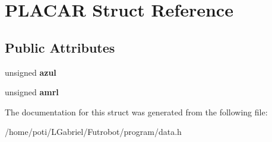 \hypertarget{structPLACAR}{}\section{P\+L\+A\+C\+AR Struct Reference}
\label{structPLACAR}
\subsection*{Public Attributes}
\begin{DoxyCompactItemize}
\item 
unsigned {\bfseries azul}\hypertarget{structPLACAR_aae2b510dd4eac68c9b2e69841c1fd625}{}\label{structPLACAR_aae2b510dd4eac68c9b2e69841c1fd625}

\item 
unsigned {\bfseries amrl}\hypertarget{structPLACAR_af18b0efd74abcb1964c5c47b1e3d03c9}{}\label{structPLACAR_af18b0efd74abcb1964c5c47b1e3d03c9}

\end{DoxyCompactItemize}


The documentation for this struct was generated from the following file\+:\begin{DoxyCompactItemize}
\item 
/home/poti/\+L\+Gabriel/\+Futrobot/program/data.\+h\end{DoxyCompactItemize}
